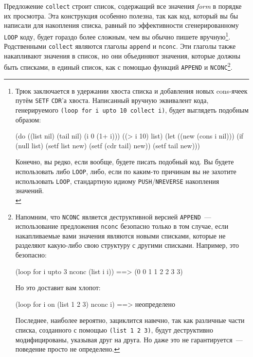 Предложение \lstinline{collect} строит список, содержащий все значения \textit{form} в порядке
их просмотра. Эта конструкция особенно полезна, так как код, который вы бы написали для
накопления списка, равный по эффективности сгенерированному \lstinline{LOOP} коду, будет
гораздо более сложным, чем вы обычно пишете вручную\footnote{\begin{minipage}[t]{\linewidth}
Трюк заключается в удержании
  хвоста списка и добавления новых cons-ячеек путём \lstinline{SETF} \lstinline{CDR}'а
  хвоста. Написанный вручную эквивалент кода, генерируемого \lstinline{(loop for i upto 10 collect i)},
  будет выглядеть подобным образом:

\begin{myverb}
(do ((list nil) (tail nil) (i 0 (1+ i)))
    ((> i 10) list)
  (let ((new (cons i nil)))
    (if (null list)
        (setf list new)
        (setf (cdr tail) new))
    (setf tail new)))
\end{myverb}

Конечно, вы редко, если вообще, будете писать подобный код. Вы будете использовать либо
\lstinline{LOOP}, либо, если по каким-то причинам вы не захотите использовать \lstinline{LOOP},
стандартную идиому \lstinline{PUSH}/\lstinline{NREVERSE} накопления значений.\\[2pt]
  \end{minipage}}\hspace{\footnotenegspace}. Родственными
\lstinline{collect} являются глаголы \lstinline{append} и \lstinline{nconc}.  Эти глаголы также
накапливают значения в список, но они объединяют значения, которые должны быть списками, в
единый список, как с помощью функций \lstinline{APPEND} и \lstinline{NCONC}\footnote{Напомним,
  что \lstinline{NCONC} является деструктивной версией \lstinline{APPEND}~--- использование
  предложения \lstinline{nconc} безопасно только в том случае, если накапливаемые вами значения
  являются новыми списками, которые не разделяют какую-либо свою структуру с другими
  списками. Например, это безопасно:

\begin{myverb}
(loop for i upto 3 nconc (list i i)) ==> (0 0 1 1 2 2 3 3)
\end{myverb}

Но это доставит вам хлопот:

\begin{myverb}
(loop for i on (list 1 2 3) nconc i) ==> неопределено
\end{myverb}

Последнее, наиболее вероятно, зациклится навечно, так как различные части списка, созданного
с помощью \lstinline{(list 1 2 3)}, будут деструктивно модифицированы, указывая друг на
друга. Но даже это не гарантируется~--- поведение просто не определено.}\hspace{\footnotenegspace}.

